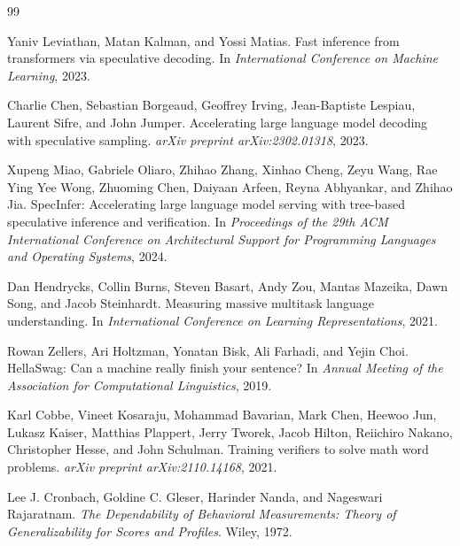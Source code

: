 \documentclass{article}
\begin{document}
\begin{thebibliography}{99}

Yaniv Leviathan, Matan Kalman, and Yossi Matias.
\newblock Fast inference from transformers via speculative decoding.
\newblock In \emph{International Conference on Machine Learning}, 2023.

Charlie Chen, Sebastian Borgeaud, Geoffrey Irving, Jean-Baptiste Lespiau, Laurent Sifre, and John Jumper.
\newblock Accelerating large language model decoding with speculative sampling.
\newblock \emph{arXiv preprint arXiv:2302.01318}, 2023.

Xupeng Miao, Gabriele Oliaro, Zhihao Zhang, Xinhao Cheng, Zeyu Wang, Rae Ying Yee Wong, Zhuoming Chen, Daiyaan Arfeen, Reyna Abhyankar, and Zhihao Jia.
\newblock SpecInfer: Accelerating large language model serving with tree-based speculative inference and verification.
\newblock In \emph{Proceedings of the 29th ACM International Conference on Architectural Support for Programming Languages and Operating Systems}, 2024.

Dan Hendrycks, Collin Burns, Steven Basart, Andy Zou, Mantas Mazeika, Dawn Song, and Jacob Steinhardt.
\newblock Measuring massive multitask language understanding.
\newblock In \emph{International Conference on Learning Representations}, 2021.

Rowan Zellers, Ari Holtzman, Yonatan Bisk, Ali Farhadi, and Yejin Choi.
\newblock HellaSwag: Can a machine really finish your sentence?
\newblock In \emph{Annual Meeting of the Association for Computational Linguistics}, 2019.

Karl Cobbe, Vineet Kosaraju, Mohammad Bavarian, Mark Chen, Heewoo Jun, Lukasz Kaiser, Matthias Plappert, Jerry Tworek, Jacob Hilton, Reiichiro Nakano, Christopher Hesse, and John Schulman.
\newblock Training verifiers to solve math word problems.
\newblock \emph{arXiv preprint arXiv:2110.14168}, 2021.

Lee J. Cronbach, Goldine C. Gleser, Harinder Nanda, and Nageswari Rajaratnam.
\newblock \emph{The Dependability of Behavioral Measurements: Theory of Generalizability for Scores and Profiles}.
\newblock Wiley, 1972.


\end{thebibliography}
\end{document}
